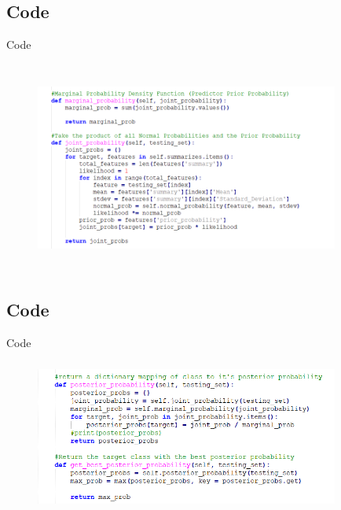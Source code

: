 \documentclass{beamer}
\begin{document}
\subsection{Code}
    \begin{frame}{Code}
        \begin{center}
            \begin{figure}
                \begin{center}
                    \includegraphics[width = 10cm, height = 7cm]{Theme/images/gaussian4.PNG}
                \end{center}
            \end{figure}
        \end{center}
    \end{frame}

\subsection{Code}
    \begin{frame}{Code}
        \begin{center}
            \begin{figure}
                \begin{center}
                    \includegraphics[width = 10cm, height = 5cm]{Theme/images/gaussian5.PNG}
                \end{center}
            \end{figure}
        \end{center}
    \end{frame}
\end{document}
